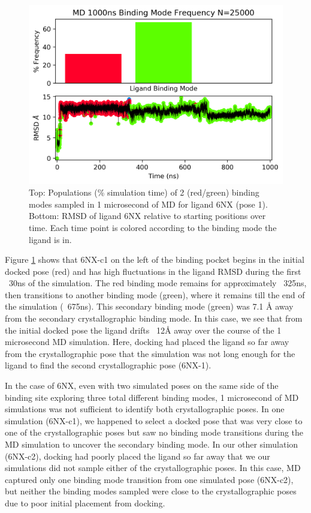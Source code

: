 \begin{figure}
    \centering
    \includegraphics[width=\linewidth]{chapter5/6NX/6NX_1_c1-full-bmodes-freq.png}
    \caption[Ligand 6NX pose 1 Binding Mode Populations]{Top: Populations (\% simulation time) of 2 (red/green) binding modes sampled in 1 microsecond of MD for ligand 6NX (pose 1). Bottom: RMSD of ligand 6NX relative to starting positions over time. Each time point is colored according to the binding mode the ligand is in.}
    \label{fig:6NX_c1_bmodes}
\end{figure}

Figure \ref{fig:6NX_c1_bmodes} shows that 6NX-c1 on the left of the binding pocket begins in the initial docked pose (red) and has high fluctuations in the ligand RMSD during the first ~30ns of the simulation.
The red binding mode remains for approximately ~325ns, then transitions to another binding mode (green), where it remains till the end of the simulation (~675ns).
This secondary binding mode (green) was 7.1 {\AA} away from the secondary crystallographic binding mode.
In this case, we see that from the initial docked pose the ligand drifts ~12{\AA} away over the course of the 1 microsecond MD simulation.
Here, docking had placed the ligand so far away from the crystallographic pose that the simulation was not long enough for the ligand to find the second crystallographic pose (6NX-1).

In the case of 6NX, even with two simulated poses on the same side of the binding site exploring three total different binding modes, 1 microsecond of MD simulations was not sufficient to identify both crystallographic poses.
In one simulation (6NX-c1), we happened to select a docked pose that was very close to one of the crystallographic poses but saw no binding mode transitions during the MD simulation to uncover the secondary binding mode.
In our other simulation (6NX-c2), docking had poorly placed the ligand so far away that we our simulations did not sample either of the crystallographic poses.
In this case, MD captured only one binding mode transition from one simulated pose (6NX-c2), but neither the binding modes sampled were close to the crystallographic poses due to poor initial placement from docking. 

